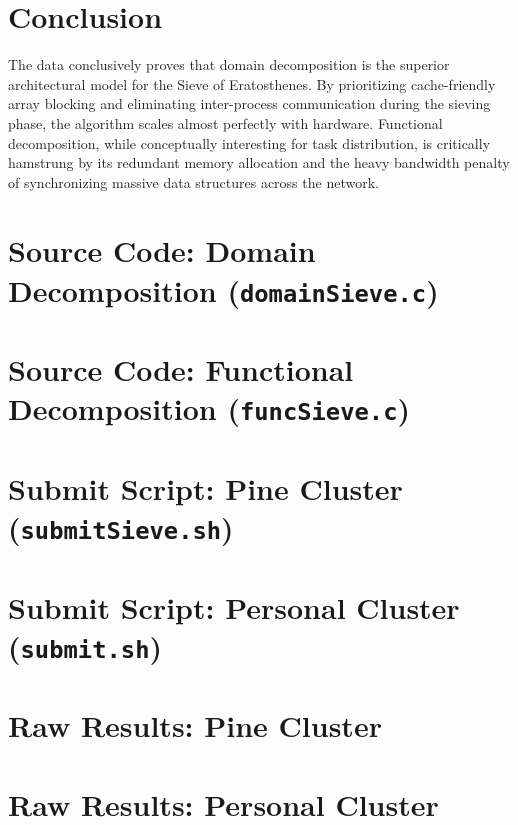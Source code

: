 \documentclass[11pt]{article}
\begin{document}
\section{Conclusion}
The data conclusively proves that domain decomposition is the superior architectural model for the Sieve of Eratosthenes. By prioritizing cache-friendly array blocking and eliminating inter-process communication during the sieving phase, the algorithm scales almost perfectly with hardware. Functional decomposition, while conceptually interesting for task distribution, is critically hamstrung by its redundant memory allocation and the heavy bandwidth penalty of synchronizing massive data structures across the network.

\newpage
\appendix
\section{Source Code: Domain Decomposition (\texttt{domainSieve.c})}


\newpage
\section{Source Code: Functional Decomposition (\texttt{funcSieve.c})}


\newpage
\section{Submit Script: Pine Cluster (\texttt{submitSieve.sh})}


\newpage
\section{Submit Script: Personal Cluster (\texttt{submit.sh})}


\newpage
\section{Raw Results: Pine Cluster}


\newpage
\section{Raw Results: Personal Cluster}

\end{document}

